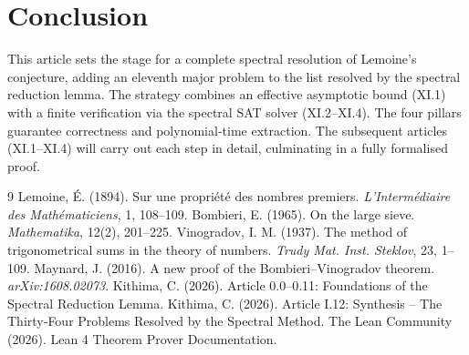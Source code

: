\documentclass[11pt,a4paper]{article}
\begin{document}
\section{Conclusion}

This article sets the stage for a complete spectral resolution of Lemoine's conjecture, adding an eleventh major problem to the list resolved by the spectral reduction lemma. The strategy combines an effective asymptotic bound (XI.1) with a finite verification via the spectral SAT solver (XI.2–XI.4). The four pillars guarantee correctness and polynomial‑time extraction. The subsequent articles (XI.1–XI.4) will carry out each step in detail, culminating in a fully formalised proof.


\begin{thebibliography}{9}
  Lemoine, É. (1894). Sur une propriété des nombres premiers. \emph{L'Intermédiaire des Mathématiciens}, 1, 108–109.
  Bombieri, E. (1965). On the large sieve. \emph{Mathematika}, 12(2), 201–225.
  Vinogradov, I. M. (1937). The method of trigonometrical sums in the theory of numbers. \emph{Trudy Mat. Inst. Steklov}, 23, 1–109.
  Maynard, J. (2016). A new proof of the Bombieri–Vinogradov theorem. \emph{arXiv:1608.02073}.
  Kithima, C. (2026). Article 0.0–0.11: Foundations of the Spectral Reduction Lemma.
  Kithima, C. (2026). Article I.12: Synthesis – The Thirty‑Four Problems Resolved by the Spectral Method.
  The Lean Community (2026). Lean 4 Theorem Prover Documentation.
\end{thebibliography}
\end{document}
